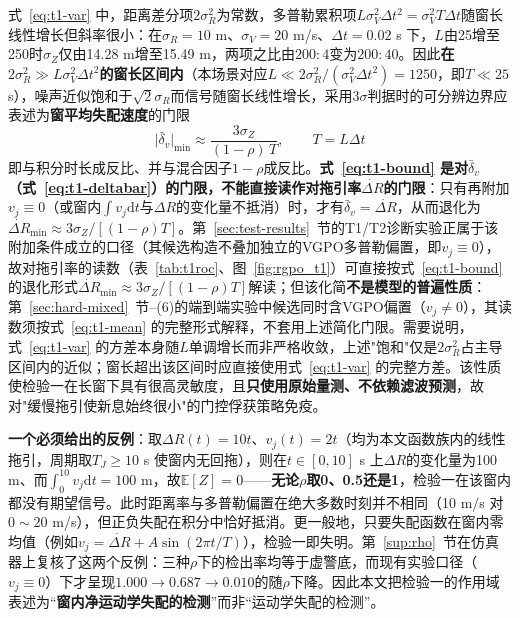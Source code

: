 \documentclass[UTF8,a4paper,zihao=-4]{ctexart}
\begin{document}
式~\eqref{eq:t1-var} 中，距离差分项\(2\sigma_R^2\)为常数，多普勒累积项\(L\sigma_V^2\Delta t^2=\sigma_V^2T\Delta t\)随窗长线性增长但斜率很小：在\(\sigma_R=10\) m、\(\sigma_V=20\) m/s、\(\Delta t=0.02\) s 下，\(L\)由25增至250时\(\sigma_Z\)仅由14.28 m增至15.49 m，两项之比由\(200:4\)变为\(200:40\)。因此\textbf{在\(2\sigma_R^2\gg L\sigma_V^2\Delta t^2\)的窗长区间内}（本场景对应\(L\ll2\sigma_R^2/(\sigma_V^2\Delta t^2)=1250\)，即\(T\ll25\) s），噪声近似饱和于\(\sqrt2\sigma_R\)而信号随窗长线性增长，采用\(3\sigma\)判据时的可分辨边界应表述为\textbf{窗平均失配速度}的门限
\begin{equation}
\bigl|\bar\delta_v\bigr|_{\min}\approx\frac{3\sigma_Z}{(1-\rho)\,T},\qquad T=L\Delta t
\label{eq:t1-bound}
\end{equation}
即与积分时长成反比、并与混合因子\(1-\rho\)成反比。\textbf{式~\eqref{eq:t1-bound} 是对\(\bar\delta_v\)（式~\eqref{eq:t1-deltabar}）的门限，不能直接读作对拖引率\(\dot{\Delta R}\)的门限}：只有再附加\(v_j\equiv0\)（或窗内\(\int v_j\mathrm{d}t\)与\(\Delta R\)的变化量不抵消）时，才有\(\bar\delta_v=\dot{\Delta R}\)，从而退化为\(\dot{\Delta R}_{\min}\approx3\sigma_Z/[(1-\rho)T]\)。第~\ref{sec:test-results}~节的T1/T2诊断实验正属于该附加条件成立的口径（其候选构造不叠加独立的VGPO多普勒偏置，即\(v_j\equiv0\)），故对拖引率的读数（表~\ref{tab:t1roc}、图~\ref{fig:rgpo_t1}）可直接按式~\eqref{eq:t1-bound} 的退化形式\(\dot{\Delta R}_{\min}\approx3\sigma_Z/[(1-\rho)T]\)解读；但该化简\textbf{不是模型的普遍性质}：第~\ref{sec:hard-mixed}~节--(6)的端到端实验中候选同时含VGPO偏置（\(v_j\neq0\)），其读数须按式~\eqref{eq:t1-mean} 的完整形式解释，不套用上述简化门限。需要说明，式~\eqref{eq:t1-var} 的方差本身随\(L\)单调增长而非严格收敛，上述"饱和"仅是\(2\sigma_R^2\)占主导区间内的近似；窗长超出该区间时应直接使用式~\eqref{eq:t1-var} 的完整方差。该性质使检验一在长窗下具有很高灵敏度，且\textbf{只使用原始量测、不依赖滤波预测}，故对"缓慢拖引使新息始终很小"的门控俘获策略免疫。

\textbf{一个必须给出的反例}：取\(\Delta R(t)=10t\)、\(v_j(t)=2t\)（均为本文函数族内的线性拖引，周期取\(T_J\ge10\) s 使窗内无回拖），则在\(t\in[0,10]\) s 上\(\Delta R\)的变化量为100 m、而\(\int_0^{10}v_j\mathrm{d}t=100\) m，故\(\mathbb E[Z]=0\)——\textbf{无论\(\rho\)取0、0.5还是1}，检验一在该窗内都没有期望信号。此时距离率与多普勒偏置在绝大多数时刻并不相同（10 m/s 对\(0\sim20\) m/s），但正负失配在积分中恰好抵消。更一般地，只要失配函数在窗内零均值（例如\(v_j=\dot{\Delta R}+A\sin(2\pi t/T)\)），检验一即失明。第~\ref{sup:rho}~节在仿真器上复核了这两个反例：三种\(\rho\)下的检出率均等于虚警底，而现有实验口径（\(v_j\equiv0\)）下才呈现\(1.000\to0.687\to0.010\)的随\(\rho\)下降。因此本文把检验一的作用域表述为“\textbf{窗内净运动学失配的检测}”而非“运动学失配的检测”。
\end{document}
